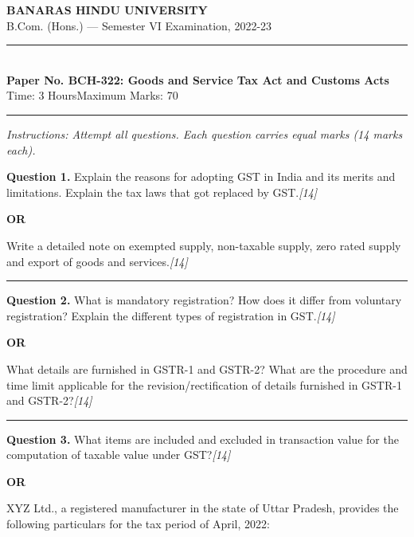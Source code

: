\documentclass[11pt,a4paper]{article}
\newcommand{\pts}[1]{\hfill   \textit{[#1]}}
\begin{document}
\begin{center}
  {\large\bfseries BANARAS HINDU UNIVERSITY}\\[2pt]
  {\normalsize B.Com. (Hons.) --- Semester VI Examination, 2022-23}\\[6pt]
  \rule{0.8\linewidth}{0.5pt}\\[6pt]
  {\large\bfseries Paper No. BCH-322: Goods and Service Tax Act and Customs Acts}\\[4pt]
  {\normalsize Time: 3 Hours\hfill Maximum Marks: 70}
\end{center}

\rule{\linewidth}{0.4pt}

\smallskip



\noindent   \textit{Instructions: Attempt all questions. Each question carries equal marks (14 marks each).}

\bigskip




\noindent   \textbf{Question 1.}
Explain the reasons for adopting GST in India and its merits and limitations. Explain the tax laws that got replaced by GST.\pts{14}

\centerline{   \textbf{OR}}

Write a detailed note on exempted supply, non-taxable supply, zero rated supply and export of goods and services.\pts{14}

\medskip\rule{\linewidth}{0.2pt}




\noindent   \textbf{Question 2.}
What is mandatory registration? How does it differ from voluntary registration? Explain the different types of registration in GST.\pts{14}

\centerline{   \textbf{OR}}

What details are furnished in GSTR-1 and GSTR-2? What are the procedure and time limit applicable for the revision/rectification of details furnished in GSTR-1 and GSTR-2?\pts{14}

\medskip\rule{\linewidth}{0.2pt}




\noindent   \textbf{Question 3.}
What items are included and excluded in transaction value for the computation of taxable value under GST?\pts{14}

\centerline{   \textbf{OR}}

XYZ Ltd., a registered manufacturer in the state of Uttar Pradesh, provides the following particulars for the tax period of April, 2022:
\end{document}
